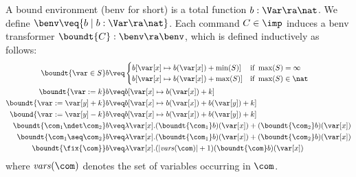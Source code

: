\begin{definition}
  \label{de:boundenv}
  A bound environment (benv for short) is a total function \(b:\Var \ra \nat\). We define 
  \(\benv \veq \{ b \mid b:\Var \ra \nat\}\).
  Each command 
  \(C\in \imp\) induces a benv transformer \(\boundt{C}:\benv \ra \benv\), which is defined inductively as follows:
  \begin{align*}
    \boundt{\var \in S}b  
    & \veq 
    \begin{cases} 
      b[\var[x]\mapsto b(\var[x])+\min(S)]& \text{if }\max(S)=\infty\\
      b[\var[x]\mapsto b(\var[x])+\max(S)]& \text{if }\max(S)\in \nat
    \end{cases}
    \\
    \boundt{\var := k}b 
    & \veq  b[\var[x]\mapsto b(\var[x])+k]\\
    \boundt{\var := \var[y] + k}b
    & \veq  b[\var[x]\mapsto b(\var[x])+b(\var[y])+k]\\
    \bound{\var := \var[y] - k}b
    & \veq  b[\var[x]\mapsto b(\var[x])+b(\var[y])+k]\\
    \boundt{\com_1 \ndet \com_2}b
    & \veq \lambda \var[x]. (\boundt{\com_1}b)(\var[x]) + (\boundt{\com_2}b)(\var[x])\\
    \boundt{\com_1 \seq \com_2}b
    & \veq \lambda \var[x]. (\boundt{\com_1}b)(\var[x]) + (\boundt{\com_2}b)(\var[x])\\
    \boundt{\fix{\com}}b
    &\veq  \lambda \var[x]. (|\mathit{vars}(\com)|+1)(\boundt{\com}b)(\var[x])
  \end{align*}    
  where \(\mathit{vars}(\com)\) denotes the set of variables occurring
  in \(\com\).
\end{definition}

